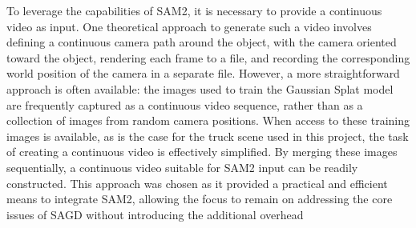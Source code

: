 \documentclass[12pt]{article}
\begin{document}
To leverage the capabilities of SAM2, it is necessary to provide a continuous video as input. One theoretical approach to generate such a video involves defining a continuous camera path around the object, with the camera oriented toward the object, rendering each frame to a file, and recording the corresponding world position of the camera in a separate file. However, a more straightforward approach is often available: the images used to train the Gaussian Splat model are frequently captured as a continuous video sequence, rather than as a collection of images from random camera positions. When access to these training images is available, as is the case for the truck scene used in this project, the task of creating a continuous video is effectively simplified. By merging these images sequentially, a continuous video suitable for SAM2 input can be readily constructed. This approach was chosen as it provided a practical and efficient means to integrate SAM2, allowing the focus to remain on addressing the core issues of SAGD without introducing the additional overhead



\FloatBarrier{}
\noindent\printbibliography
\end{document}
